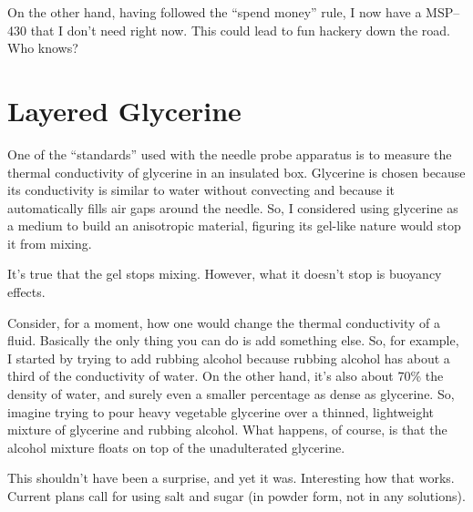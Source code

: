 On the other hand, having followed the ``spend money'' rule, I now have
a MSP--430 that I don't need right now. This could lead to fun hackery
down the road. Who knows?

\section{Layered Glycerine}

One of the ``standards'' used with the needle probe apparatus is to
measure the thermal conductivity of glycerine in an insulated box.
Glycerine is chosen because its conductivity is similar to water without
convecting and because it automatically fills air gaps around the
needle. So, I considered using glycerine as a medium to build an
anisotropic material, figuring its gel-like nature would stop it from
mixing.

It's true that the gel stops mixing. However, what it doesn't stop is
buoyancy effects.

Consider, for a moment, how one would change the thermal conductivity of
a fluid. Basically the only thing you can do is add something else. So,
for example, I started by trying to add rubbing alcohol because rubbing
alcohol has about a third of the conductivity of water. On the other
hand, it's also about 70\% the density of water, and surely even a
smaller percentage as dense as glycerine. So, imagine trying to pour
heavy vegetable glycerine over a thinned, lightweight mixture of
glycerine and rubbing alcohol. What happens, of course, is that the
alcohol mixture floats on top of the unadulterated glycerine.

This shouldn't have been a surprise, and yet it was. Interesting how
that works. Current plans call for using salt and sugar (in powder form,
not in any solutions).
